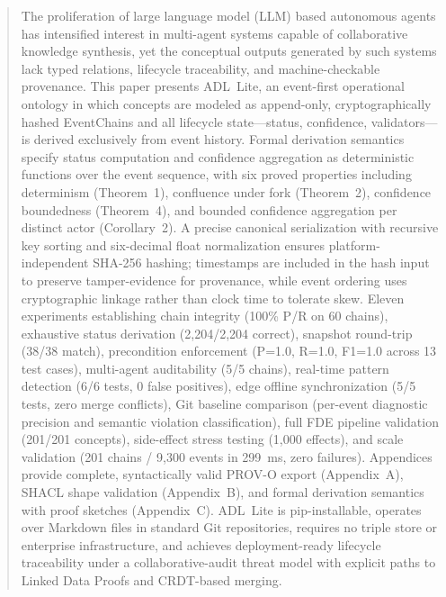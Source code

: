 \begin{abstract}
The proliferation of large language model (LLM) based autonomous agents has intensified interest in multi-agent systems capable of collaborative knowledge synthesis, yet the conceptual outputs generated by such systems lack typed relations, lifecycle traceability, and machine-checkable provenance. This paper presents ADL~Lite, an event-first operational ontology in which concepts are modeled as append-only, cryptographically hashed EventChains and all lifecycle state---status, confidence, validators---is derived exclusively from event history. Formal derivation semantics specify status computation and confidence aggregation as deterministic functions over the event sequence, with six proved properties including determinism (Theorem~1), confluence under fork (Theorem~2), confidence boundedness (Theorem~4), and bounded confidence aggregation per distinct actor (Corollary~2). A precise canonical serialization with recursive key sorting and six-decimal float normalization ensures platform-independent SHA-256 hashing; timestamps are included in the hash input to preserve tamper-evidence for provenance, while event ordering uses cryptographic linkage rather than clock time to tolerate skew. Eleven experiments establishing chain integrity (100\% P/R on 60 chains), exhaustive status derivation (2,204/2,204 correct), snapshot round-trip (38/38 match), precondition enforcement (P=1.0, R=1.0, F1=1.0 across 13 test cases), multi-agent auditability (5/5 chains), real-time pattern detection (6/6 tests, 0 false positives), edge offline synchronization (5/5 tests, zero merge conflicts), Git baseline comparison (per-event diagnostic precision and semantic violation classification), full FDE pipeline validation (201/201 concepts), side-effect stress testing (1,000 effects), and scale validation (201 chains / 9,300 events in 299~ms, zero failures). Appendices provide complete, syntactically valid PROV-O export (Appendix~A), SHACL shape validation (Appendix~B), and formal derivation semantics with proof sketches (Appendix~C). ADL~Lite is pip-installable, operates over Markdown files in standard Git repositories, requires no triple store or enterprise infrastructure, and achieves deployment-ready lifecycle traceability under a collaborative-audit threat model with explicit paths to Linked Data Proofs and CRDT-based merging.
\end{abstract}
